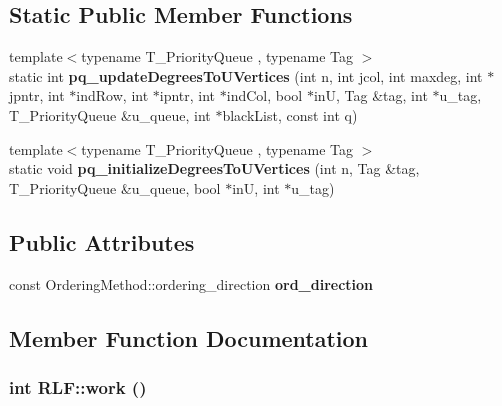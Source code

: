 \subsection*{Static Public Member Functions}
\begin{DoxyCompactItemize}
\item 
\hypertarget{classRLF_a601cf7fff1ba0d4725723739ac4ca7a4}{
{\footnotesize template$<$typename T\_\-PriorityQueue , typename Tag $>$ }\\static int {\bfseries pq\_\-updateDegreesToUVertices} (int n, int jcol, int maxdeg, int $\ast$jpntr, int $\ast$indRow, int $\ast$ipntr, int $\ast$indCol, bool $\ast$inU, Tag \&tag, int $\ast$u\_\-tag, T\_\-PriorityQueue \&u\_\-queue, int $\ast$blackList, const int q)}
\label{classRLF_a601cf7fff1ba0d4725723739ac4ca7a4}

\item 
\hypertarget{classRLF_a03f1d1159fba88ffcf071ccf3b7e26b2}{
{\footnotesize template$<$typename T\_\-PriorityQueue , typename Tag $>$ }\\static void {\bfseries pq\_\-initializeDegreesToUVertices} (int n, Tag \&tag, T\_\-PriorityQueue \&u\_\-queue, bool $\ast$inU, int $\ast$u\_\-tag)}
\label{classRLF_a03f1d1159fba88ffcf071ccf3b7e26b2}

\end{DoxyCompactItemize}
\subsection*{Public Attributes}
\begin{DoxyCompactItemize}
\item 
\hypertarget{classRLF_a281dd488844b24d24d5bc86a1e9c04ab}{
const OrderingMethod::ordering\_\-direction {\bfseries ord\_\-direction}}
\label{classRLF_a281dd488844b24d24d5bc86a1e9c04ab}

\end{DoxyCompactItemize}


\subsection{Member Function Documentation}
\hypertarget{classRLF_a327af9b44d25f836502b0184a98e673d}{
\subsubsection[{work}]{\setlength{\rightskip}{0pt plus 5cm}int RLF::work ()}}
\label{classRLF_a327af9b44d25f836502b0184a98e673d}


